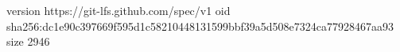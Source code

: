 version https://git-lfs.github.com/spec/v1
oid sha256:dc1e90c397669f595d1c58210448131599bbf39a5d508e7324ca77928467aa93
size 2946
